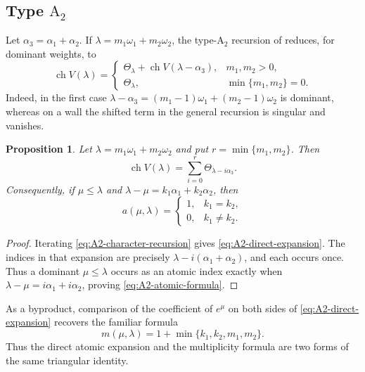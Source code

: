 \documentclass[11pt]{article}
\newtheorem{proposition}[proposition]{Proposition}
\theoremstyle{definition}
\theoremstyle{remark}
\newcommand{\chr}{\operatorname{ch}}
\newcommand{\typeA}{\ensuremath{\mathrm{A}}}
\begin{document}
\subsection{Type $\typeA_2$}

Let $\alpha_3=\alpha_1+\alpha_2$.  If
$\lambda=m_1\omega_1+m_2\omega_2$, the type-$\typeA_2$ recursion of
\cite{Schutzer} reduces, for dominant weights, to
\begin{equation}\label{eq:A2-character-recursion}
 \chr V(\lambda)=
 \begin{cases}
   \Theta_\lambda+\chr V(\lambda-\alpha_3),&m_1,m_2>0,\\
   \Theta_\lambda,&\min\{m_1,m_2\}=0.
 \end{cases}
\end{equation}
Indeed, in the first case
$\lambda-\alpha_3=(m_1-1)\omega_1+(m_2-1)\omega_2$ is dominant, whereas on a
wall the shifted term in the general recursion is singular and vanishes.

\begin{proposition}\label{prop:A2-direct}
Let $\lambda=m_1\omega_1+m_2\omega_2$ and put
$r=\min\{m_1,m_2\}$.  Then
\begin{equation}\label{eq:A2-direct-expansion}
  \chr V(\lambda)=\sum_{i=0}^{r}\Theta_{\lambda-i\alpha_3}.
\end{equation}
Consequently, if $\mu\le\lambda$ and
$\lambda-\mu=k_1\alpha_1+k_2\alpha_2$, then
\begin{equation}\label{eq:A2-atomic-formula}
 a(\mu,\lambda)=
 \begin{cases}
  1,&k_1=k_2,\\
  0,&k_1\ne k_2.
 \end{cases}
\end{equation}
\end{proposition}

\begin{proof}
Iterating \eqref{eq:A2-character-recursion} gives
\eqref{eq:A2-direct-expansion}.  The indices in that expansion are precisely
$\lambda-i(\alpha_1+\alpha_2)$, and each occurs once.  Thus a dominant
$\mu\le\lambda$ occurs as an atomic index exactly when
$\lambda-\mu=i\alpha_1+i\alpha_2$, proving
\eqref{eq:A2-atomic-formula}.
\end{proof}

As a byproduct, comparison of the coefficient of $e^\mu$ on both sides of
\eqref{eq:A2-direct-expansion} recovers the familiar formula
\[
 m(\mu,\lambda)=1+\min\{k_1,k_2,m_1,m_2\}.
\]
Thus the direct atomic expansion and the multiplicity formula are two forms of
the same triangular identity.
\end{document}
